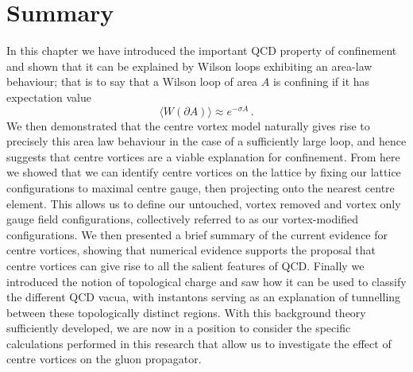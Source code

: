 \section{Summary}
In this chapter we have introduced the important QCD property of confinement and shown that it can be explained by Wilson loops exhibiting an area-law behaviour; that is to say that a Wilson loop of area $A$ is confining if it has expectation value
%
\begin{equation}
\langle W(\partial A)\rangle \approx e^{-\sigma A}\, .
\end{equation}
%
We then demonstrated that the centre vortex model naturally gives rise to precisely this area law behaviour in the case of a sufficiently large loop, and hence suggests that centre vortices are a viable explanation for confinement. From here we showed that we can identify centre vortices on the lattice by fixing our lattice configurations to maximal centre gauge, then projecting onto the nearest centre element. This allows us to define our untouched, vortex removed and vortex only gauge field configurations, collectively referred to as our vortex-modified configurations. We then presented a brief summary of the current evidence for centre vortices, showing that numerical evidence supports the proposal that centre vortices can give rise to all the salient features of QCD. Finally we introduced the notion of topological charge and saw how it can be used to classify the different QCD vacua, with instantons serving as an explanation of tunnelling between these topologically distinct regions. With this background theory sufficiently developed, we are now in a position to consider the specific calculations performed in this research that allow us to investigate the effect of centre vortices on the gluon propagator.

